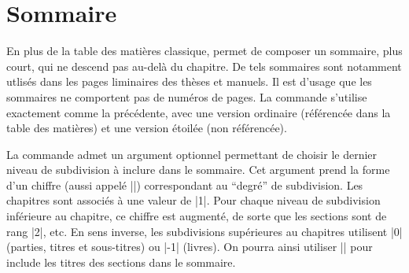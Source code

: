 \begin{macro}
\end{macro}

\begin{noprint}
\end{noprint}


\section{Sommaire}

En plus de la table des matières classique, \frenchlaw permet de composer un sommaire, plus court, qui ne descend pas au-delà du chapitre. De tels sommaires sont notamment utlisés dans les pages liminaires des thèses et manuels. Il est d'usage que les sommaires ne comportent pas de numéros de pages. La commande  s'utilise exactement comme la précédente, avec une version ordinaire (référencée dans la table des matières) et une version étoilée (non référencée).

\begin{macro}
	\shortcontents
	\shortcontents*
\end{macro}

La commande admet un argument optionnel permettant de choisir le dernier niveau de subdivision à inclure dans le sommaire. Cet argument prend la forme d'un chiffre (aussi appelé |\tocdepth|) correspondant au \enquote{degré} de subdivision. Les chapitres sont associés à une valeur de |1|. Pour chaque niveau de subdivision inférieure au chapitre, ce chiffre est augmenté, de sorte que les sections sont de rang |2|, etc. En sens inverse, les subdivisions supérieures au chapitres utilisent |0| (parties, titres et sous-titres) ou |-1| (livres). On pourra ainsi utiliser |\shortcontents[2]| pour include les titres des sections dans le sommaire.

